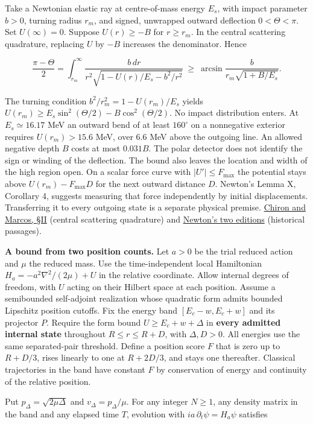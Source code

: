 \documentclass[11pt,a4paper]{article}
\begin{document}
Take a Newtonian elastic ray at centre-of-mass energy \(E_s\), with
impact parameter \(b>0\), turning radius \(r_m\), and signed, unwrapped
outward deflection \(0<\Theta<\pi\). Set \(U(\infty)=0\). Suppose
\(U(r)\ge-B\) for \(r\ge r_m\). In the central scattering quadrature,
replacing \(U\) by \(-B\) increases the denominator. Hence

\[
 \frac{\pi-\Theta}{2}
 =\int_{r_m}^\infty\frac{b\,dr}{r^2\sqrt{1-U(r)/E_s-b^2/r^2}}
 \ \ge\ \arcsin\!\frac{b}{r_m\sqrt{1+B/E_s}} .
\]

The turning condition \(b^2/r_m^2=1-U(r_m)/E_s\) yields
\(U(r_m)\ge E_s\sin^2(\Theta/2)-B\cos^2(\Theta/2)\). No impact
distribution enters. At \(E_s\simeq16.17\) MeV an outward bend of at
least \(160^\circ\) on a nonnegative exterior requires \(U(r_m)>15.6\)
MeV, over \(6.6\) MeV above the outgoing line. An allowed negative depth
\(B\) costs at most \(0.031 B\). The polar detector does not identify
the sign or winding of the deflection. The bound also leaves the
location and width of the high region open. On a scalar force curve with
\(|U'|\le F_{\max}\) the potential stays above \(U(r_m)-F_{\max}D\) for
the next outward distance \(D\). Newton's Lemma X, Corollary 4, suggests
measuring that force independently by initial displacements.
Transferring it to every outgoing state is a separate physical premise.
\href{https://arxiv.org/html/1601.00064}{Chiron and Marcos, §II}
(central scattering quadrature) and
\href{newton-insertion-action.md\#lemma-x-and-the-measurement-of-initial-force}{Newton's
two editions} (historical passages).

\textbf{A bound from two position counts.} Let \(a>0\) be the trial
reduced action and \(\mu\) the reduced mass. Use the time-independent
local Hamiltonian \(H_a=-a^2\nabla^2/(2\mu)+U\) in the relative
coordinate. Allow internal degrees of freedom, with \(U\) acting on
their Hilbert space at each position. Assume a semibounded self-adjoint
realization whose quadratic form admits bounded Lipschitz position
cutoffs. Fix the energy band \([E_c-w,E_c+w]\) and its projector \(P\).
Require the form bound \(U\ge E_c+w+\Delta\) in \textbf{every admitted
internal state} throughout \(R\le r\le R+D\), with \(\Delta,D>0\). All
energies use the same separated-pair threshold. Define a position score
\(F\) that is zero up to \(R+D/3\), rises linearly to one at \(R+2D/3\),
and stays one thereafter. Classical trajectories in the band have
constant \(F\) by conservation of energy and continuity of the relative
position.

Put \(p_\Delta=\sqrt{2\mu\Delta}\) and \(v_\Delta=p_\Delta/\mu\). For
any integer \(N\ge1\), any density matrix in the band and any elapsed
time \(T\), evolution with \(i a\,\partial_t\psi=H_a\psi\) satisfies
\end{document}
